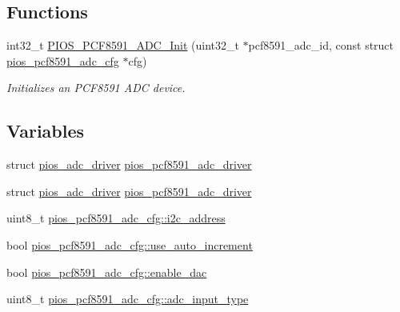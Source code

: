 \subsection*{\-Functions}
\begin{DoxyCompactItemize}
\item 
int32\-\_\-t \hyperlink{group___p_i_o_s___p_c_f8591___a_d_c_gad9edcb9a1ed62a8a21748ce56d272b05}{\-P\-I\-O\-S\-\_\-\-P\-C\-F8591\-\_\-\-A\-D\-C\-\_\-\-Init} (uint32\-\_\-t $\ast$pcf8591\-\_\-adc\-\_\-id, const struct \hyperlink{structpios__pcf8591__adc__cfg}{pios\-\_\-pcf8591\-\_\-adc\-\_\-cfg} $\ast$cfg)
\begin{DoxyCompactList}\small\item\em \-Initializes an \-P\-C\-F8591 \-A\-D\-C device. \end{DoxyCompactList}\end{DoxyCompactItemize}
\subsection*{\-Variables}
\begin{DoxyCompactItemize}
\item 
struct \hyperlink{structpios__adc__driver}{pios\-\_\-adc\-\_\-driver} \hyperlink{group___p_i_o_s___p_c_f8591___a_d_c_ga5130c9fc21788de966e89cdda587e568}{pios\-\_\-pcf8591\-\_\-adc\-\_\-driver}
\item 
struct \hyperlink{structpios__adc__driver}{pios\-\_\-adc\-\_\-driver} \hyperlink{group___p_i_o_s___p_c_f8591___a_d_c_ga5130c9fc21788de966e89cdda587e568}{pios\-\_\-pcf8591\-\_\-adc\-\_\-driver}
\item 
uint8\-\_\-t \hyperlink{group___p_i_o_s___p_c_f8591___a_d_c_gae67d73ed1272f02fb5f31eb18a31d9b8}{pios\-\_\-pcf8591\-\_\-adc\-\_\-cfg\-::i2c\-\_\-address}
\item 
bool \hyperlink{group___p_i_o_s___p_c_f8591___a_d_c_ga20ee95c4cade76e7ad834f18e30d4123}{pios\-\_\-pcf8591\-\_\-adc\-\_\-cfg\-::use\-\_\-auto\-\_\-increment}
\item 
bool \hyperlink{group___p_i_o_s___p_c_f8591___a_d_c_gad7d1cb320c59f88ea6cf49c65282ba19}{pios\-\_\-pcf8591\-\_\-adc\-\_\-cfg\-::enable\-\_\-dac}
\item 
uint8\-\_\-t \hyperlink{group___p_i_o_s___p_c_f8591___a_d_c_ga4c8aacdc272129b5e9d614a47a93cd06}{pios\-\_\-pcf8591\-\_\-adc\-\_\-cfg\-::adc\-\_\-input\-\_\-type}
\end{DoxyCompactItemize}



